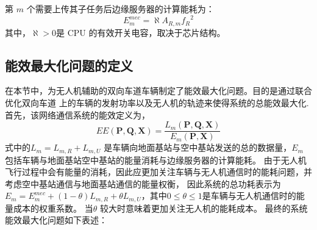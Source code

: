 第 $m$ 个需要上传其子任务后边缘服务器的计算能耗为：
\begin{equation} \label{E4-55}
E_{m}^{mec}=\aleph A_{R,m}{f_R}^2%
\end{equation}
其中，$\aleph > 0 $是 CPU 的有效开关电容，取决于芯片结构。
\subsection{能效最大化问题的定义}\label{section4-2-3}
在本节中，为无人机辅助的双向车道车辆制定了能效最大化问题。目的是通过联合优化双向车道
上的车辆的发射功率以及无人机的轨迹来使得系统的总能效最大化.
首先，该网络通信系统的能效定义为，
\begin{equation} \label{E4-12}
EE(\mathbf{P}, \mathbf{Q}, \mathbf{X})=
{\frac{{{L}_{m}}\left( \mathbf{P}, \mathbf{Q}, \mathbf{X} \right)}
{{{E}_{m}}\left( \mathbf{P}, \mathbf{X} \right)}}
\end{equation}
式中的${{L}_{m}={L}_{m,R}+{L}_{m,U}}$ 是车辆向地面基站与空中基站发送的总的数据量，${E}_{m}$ 包括车辆与地面基站空中基站的能量消耗与边缘服务器的计算能耗。
由于无人机飞行过程中会有能量的消耗，因此应更加关注车辆与无人机通信时的能耗问题，并考虑空中基站通信与地面基站通信的能量权衡，
因此系统的总功耗表示为${{E}_{m}=E_{m}^{mec}+(1-\theta){L}_{m,R}+\theta{L}_{m,U}}$，其中$0\le \theta \le 1$是车辆与无人机通信时的能量成本的权重系数。
当$\theta$ 较大时意味着更加关注无人机的能耗成本。
最终的系统能效最大化问题如下表述：
